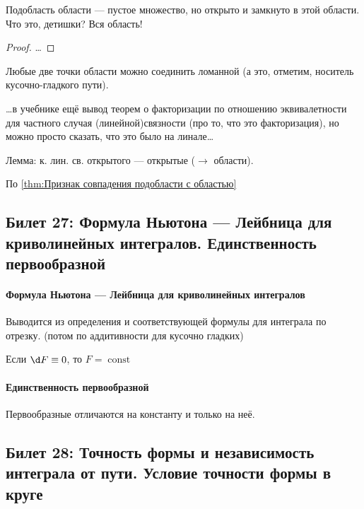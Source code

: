 \documentclass[12pt, a4paper, oneside]{memoir}
\begin{document}
\begin{lemma}\label{thm:Признак совпадения подобласти с областью}
    Подобласть области — пустое множество, но открыто и замкнуто в этой области. Что это, детишки? Вся область!
    
    \begin{proof}
        …
    \end{proof}
\end{lemma}

\begin{theorem}
    Любые две точки области можно соединить ломанной (а это, отметим, носитель кусочно-гладкого пути).
\end{theorem}

…в учебнике ещё вывод теорем о факторизации по отношению эквивалетности для частного случая (линейной)связности (про то, что это факторизация), 
но можно просто сказать, что это было на линале…

Лемма: к. лин. св. открытого — открытые ($→$ области).

По \ref*{thm:Признак совпадения подобласти с областью} 



\subsection{Билет 27: Формула Ньютона — Лейбница для криволинейных интегралов. Единственность первообразной}

\paragraph{Формула Ньютона — Лейбница для криволинейных интегралов}
Выводится из определения и соответствующей формулы для интеграла по отрезку.
(потом по аддитивности для кусочно гладких)

\begin{corollary}
    Если $\d F \equiv 0$, то $F = \operatorname{const}$
\end{corollary}

\paragraph{Единственность первообразной}
Первообразные отличаются на константу и только на неё.


\subsection{Билет 28: Точность формы и независимость интеграла от пути. Условие точности формы в круге}
\end{document}
